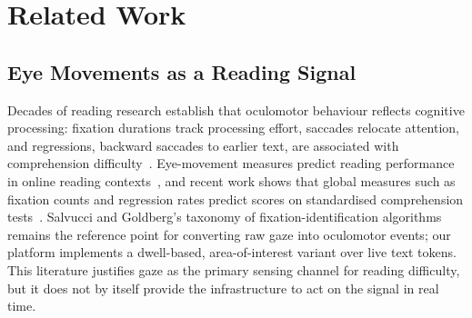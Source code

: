 \section{Related Work}
\label{sec:related-work}

\subsection{Eye Movements as a Reading Signal}
Decades of reading research establish that oculomotor behaviour reflects cognitive processing: fixation durations track processing effort, saccades relocate attention, and regressions, backward saccades to earlier text, are associated with comprehension difficulty~\cite{rayner1998eyemovements, rayner2009eyemovements}.
Eye-movement measures predict reading performance in online reading contexts~\cite{guan2022predictive}, and recent work shows that global measures such as fixation counts and regression rates predict scores on standardised comprehension tests~\cite{meziere2023predicting}.
Salvucci and Goldberg's taxonomy of fixation-identification algorithms~\cite{salvucci2000identifying} remains the reference point for converting raw gaze into oculomotor events; our platform implements a dwell-based, area-of-interest variant over live text tokens.
This literature justifies gaze as the primary sensing channel for reading difficulty, but it does not by itself provide the infrastructure to act on the signal in real time.

